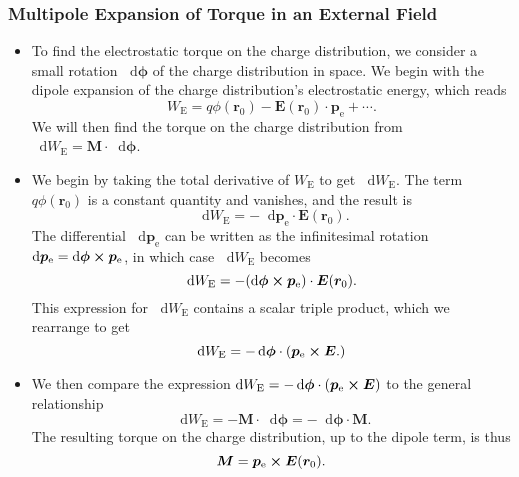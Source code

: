 \documentclass[11pt, a4paper]{article}
\newcommand{\diff}{\mathop{}\!\mathrm{d}} %
\renewcommand{\vec}[1]{\bm{#1}} %
\renewcommand{\r}{\vec{r}}
\newcommand{\E}{\vec{E}} %
\newcommand{\M}{\vec{M}}  %
\newcommand{\pe}{\vec{p}_{\text{e}}}  %
\begin{document}
\subsubsection{Multipole Expansion of Torque in an External Field}

\begin{itemize}

	\item To find the electrostatic torque on the charge distribution, we consider a small rotation $ \diff \vec{\phi} $ of the charge distribution in space. We begin with the dipole expansion of the charge distribution's electrostatic energy, which reads
	\begin{equation*}
		W_{\text{E}} = q \phi(\r_{0}) - \E (\r_{0}) \cdot \pe + \cdots.
	\end{equation*}
    We will then find the torque on the charge distribution from $ \diff W_{\text{E}} = \M \cdot \diff \vec{\phi} $.

    \item We begin by taking the total derivative of $ W_{\text{E}} $ to get $ \diff W_{\text{E}} $. The term $ q \phi(\r_{0}) $ is a constant quantity and vanishes, and the result is
	\begin{equation*}
		\diff W_{\text{E}} = - \diff \pe \cdot \E(\r_{0}).
	\end{equation*}
    The differential $ \diff \pe $ can be written as the infinitesimal rotation $ \diff \pe = \diff \vec{\phi} \cross \pe $, in which case $ \diff W_{\text{E}} $ becomes
	\begin{equation*}
		\diff W_{\text{E}} = - (\diff \vec{\phi} \cross \pe)\cdot \E(\r_{0}).
	\end{equation*}
    This expression for $ \diff W_{\text{E}} $ contains a scalar triple product, which we rearrange to get
    \begin{equation*}
        \diff W_{\text{E}} = - \diff \vec{\phi} \cdot (\pe \cross \E.)
    \end{equation*}

    \item We then compare the expression $ \diff W_{\text{E}} = - \diff \vec{\phi} \cdot (\pe \cross \E) $ to the general relationship
	\begin{equation*}
        \diff W_{\text{E}} = - \vec{M} \cdot \diff \vec{\phi} = - \diff \vec{\phi} \cdot \M.
	\end{equation*}
    The resulting torque on the charge distribution, up to the dipole term, is thus 
    \begin{equation*}
       \vec{M} = \pe \cross \E(\r_{0}).
    \end{equation*}
	
\end{itemize}
    
\end{document}
